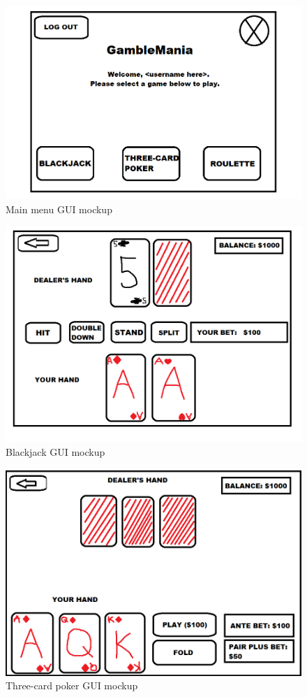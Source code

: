 \documentclass[10pt,conference,onecolumn,compsoc]{IEEEtran}
\begin{document}
\begin{figure}[h]
\caption{Main menu GUI mockup}
\includegraphics[scale=0.4]{main}
\centering
\end{figure}

\begin{figure}[h]
\caption{Blackjack GUI mockup}
\includegraphics[scale=0.4]{blackjack}
\centering
\end{figure}

\begin{figure}[h]
\caption{Three-card poker GUI mockup}
\includegraphics[scale=0.4]{three-card}
\centering
\end{figure}
\end{document}

